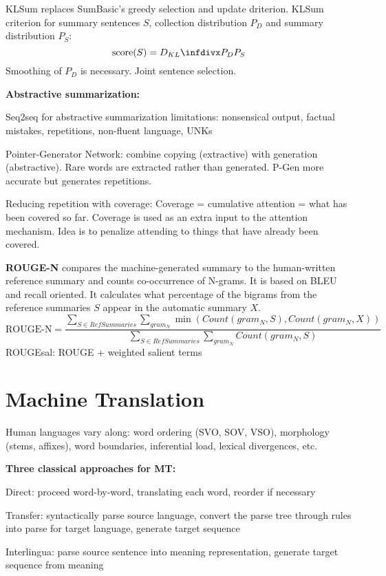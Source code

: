 \documentclass[12pt]{article}
\begin{document}
\ole
\par KLSum replaces SumBasic's greedy selection and update driterion. KLSum criterion for summary sentences $S$, collection distribution $P_D$ and summary distribution $P_S$:
\[ \text{score}(S) = \dkl{P_D}{P_S} \]
Smoothing of $P_D$ is necessary. Joint sentence selection.
\par \textbf{Abstractive summarization:}
\ulb
\item Seq2seq for abstractive summarization limitations: nonsensical output, factual mistakes, repetitions, non-fluent language, UNKs
\item Pointer-Generator Network: combine copying (extractive) with generation (abstractive). Rare words are extracted rather than generated. P-Gen more accurate but generates repetitions. 
\item Reducing repetition with coverage: Coverage = cumulative attention = what has been covered so far. Coverage is used as an extra input to the attention mechanism. Idea is to penalize attending to things that have already been covered.
\ule
\par \textbf{ROUGE-N} compares the machine-generated summary to the human-written reference summary and counts co-occurrence of N-grams. It is based on BLEU and recall oriented. It calculates what percentage of the bigrams from the reference summaries $S$ appear in the automatic summary $X$.
\[ \text{ROUGE-N} = \frac{\sum_{S\in RefSummaries}\sum_{gram_N} \min(Count(gram_N , S), Count(gram_N , X))}{\sum_{S\in RefSummaries}\sum_{gram_N} Count(gram_N , S)} \]
ROUGEsal: ROUGE + weighted salient terms

\section{Machine Translation}
\par Human languages vary along: word ordering (SVO, SOV, VSO), morphology (stems, affixes), word boundaries, inferential load, lexical divergences, etc.
\par \textbf{Three classical approaches for MT:}
\ulb
\item Direct: proceed word-by-word, translating each word, reorder if necessary
\item Transfer: syntactically parse source language, convert the parse tree through rules into parse for target language, generate target sequence
\item Interlingua: parse source sentence into meaning representation, generate target sequence from meaning
\ule
\end{document}
